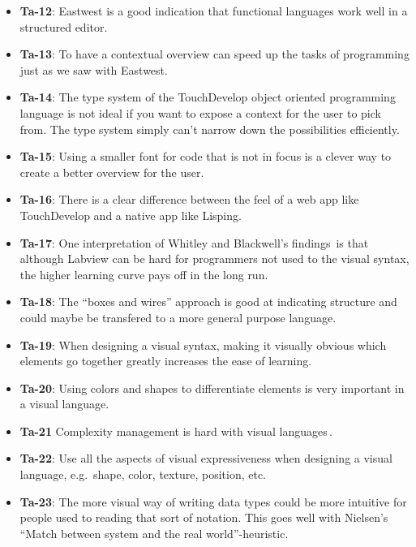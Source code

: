 \begin{itemize}
	\item \textbf{Ta-12}: Eastwest is a good indication that functional languages work well in a structured editor.
	\item \textbf{Ta-13}: To have a contextual overview can speed up the tasks of programming just as we saw with Eastwest.
	\item \textbf{Ta-14}: The type system of the TouchDevelop object oriented programming language is not ideal if you want to expose a context for the user to pick from. The type system simply can't narrow down the possibilities efficiently.
	\item \textbf{Ta-15}: Using a smaller font for code that is not in focus is a clever way to create a better overview for the user.
	\item \textbf{Ta-16}: There is a clear difference between the feel of a web app like TouchDevelop and a native app like Lisping.
	\item \textbf{Ta-17}: One interpretation of Whitley and Blackwell's findings\,\cite{WHITLEY2001435} is that although Labview can be hard for programmers not used to the visual syntax, the higher learning curve pays off in the long run.
	\item \textbf{Ta-18}: The ``boxes and wires'' approach is good at indicating structure and could maybe be transfered to a more general purpose language.
	\item \textbf{Ta-19}: When designing a visual syntax, making it visually obvious which elements go together greatly increases the ease of learning.
	\item \textbf{Ta-20}: Using colors and shapes to differentiate elements is very important in a visual language.
	\item \textbf{Ta-21} Complexity management is hard with visual languages\,\cite{green1992visual}.
	\item \textbf{Ta-22}: Use all the aspects of visual expressiveness when designing a visual language, e.g.\ shape, color, texture, position, etc.
	\item \textbf{Ta-23}: The more visual way of writing data types could be more intuitive for people used to reading that sort of notation. This goes well with Nielsen’s ``Match between system and the real world''-heuristic.
\end{itemize}